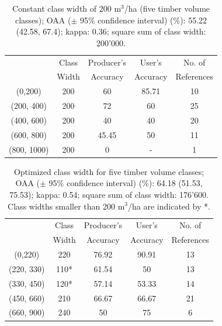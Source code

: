 \begin{table}[H]
	\begin{center}
		\caption{Constant class width of  200 m$^3$/ha (five timber volume classes);  OAA ($\pm$ 95\% confidence interval) (\%): 55.22 (42.58, 67.4);  kappa: 0.36; square sum of class width: 200'000.}
		\vspace{0.2cm}
		\label{tab:classacc1}
		{\small %
			\begin{tabular}{|c|c|c|c|c|} %
				\hlineB{1}
				\multirow{2}{*}{Classes} & Class & Producer's & User's & No. of\\ 
				& Width & Accuracy & Accuracy & References\\
				\hline \hline
				(0,200) & 200 & 60 & 85.71 & 10 \\
				(200, 400) & 200 & 72 & 60 & 25 \\
				(400, 600) & 200 & 40 & 40 & 20 \\
				(600, 800) & 200 & 45.45 & 50 & 11 \\
				(800, 1000) & 200 & 0 & - & 1 \\
				\hline \hline
			\end{tabular}
		}%
	\end{center}
\end{table}


\begin{table}[H]
	\begin{center}
		\caption{Optimized class width for five timber volume classes;  OAA ($\pm$ 95\% confidence interval) (\%): 64.18 (51.53, 75.53);  kappa: 0.54; square sum of class width: 176'600. Class widths smaller than 200 m$^3$/ha are indicated by *.}
		\vspace{0.2cm}
		\label{tab:classacc2}
		{\small %
			\begin{tabular}{|c|c|c|c|c|} %
				\hlineB{1}
				\multirow{2}{*}{Classes} & Class & Producer's & User's & No. of\\ 
				& Width & Accuracy & Accuracy & References\\
				\hline \hline
				(0,220) & 220 & 76.92 & 90.91 & 13 \\
				(220, 330) & 110* & 61.54 & 50 & 13 \\
				(330, 450) & 120* & 57.14 & 53.33 & 14 \\
				(450, 660) & 210 & 66.67 & 66.67 & 21 \\
				(660, 900) & 240 & 50 & 75 & 6 \\
				\hline \hline
			\end{tabular}
		}%
	\end{center}
\end{table}

